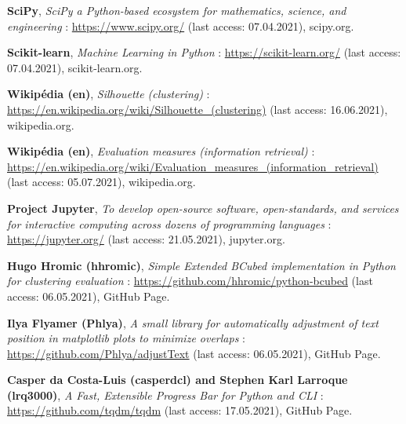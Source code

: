 \begin{thebibliography}{9}
\textbf{SciPy},
\textit{SciPy a Python-based ecosystem for mathematics, science, and engineering} : \url{https://www.scipy.org/} (last access: 07.04.2021),
scipy.org.

\textbf{Scikit-learn},
\textit{Machine Learning in Python} : \url{https://scikit-learn.org/} (last access: 07.04.2021),
scikit-learn.org.

\textbf{Wikipédia (en)},
\textit{Silhouette (clustering)} : \url{https://en.wikipedia.org/wiki/Silhouette_(clustering)} (last access: 16.06.2021),
wikipedia.org.

\textbf{Wikipédia (en)},
\textit{Evaluation measures (information retrieval)} : \url{https://en.wikipedia.org/wiki/Evaluation_measures_(information_retrieval)} (last access: 05.07.2021),
wikipedia.org.

\textbf{Project Jupyter},
\textit{To develop open-source software, open-standards, and services for interactive computing across dozens of programming languages} : \url{https://jupyter.org/} (last access: 21.05.2021),
jupyter.org.

\textbf{Hugo Hromic (hhromic)},
\textit{Simple Extended BCubed implementation in Python for clustering evaluation} : \url{https://github.com/hhromic/python-bcubed} (last access: 06.05.2021),
GitHub Page.

\textbf{Ilya Flyamer (Phlya)},
\textit{A small library for automatically adjustment of text position in matplotlib plots to minimize overlaps} : \url{https://github.com/Phlya/adjustText} (last access: 06.05.2021),
GitHub Page.

\textbf{Casper da Costa-Luis (casperdcl) and Stephen Karl Larroque (lrq3000)},
\textit{A Fast, Extensible Progress Bar for Python and CLI} : \url{https://github.com/tqdm/tqdm} (last access: 17.05.2021),
GitHub Page.

\end{thebibliography}
